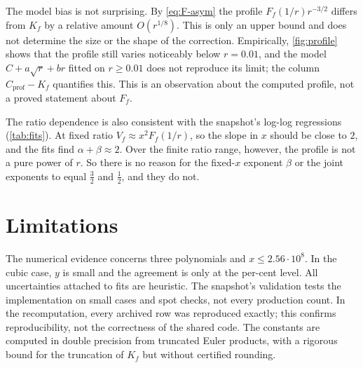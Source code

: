The model bias is not surprising. By \eqref{eq:F-asym} the profile $F_f(1/r)r^{-3/2}$ differs from $K_f$ by a relative amount $O(r^{1/8})$. This is only an upper bound and does not determine the size or the shape of the correction. Empirically, \cref{fig:profile} shows that the profile still varies noticeably below $r=0.01$, and the model $C+a\sqrt r+br$ fitted on $r\ge0.01$ does not reproduce its limit; the column $C_{\mathrm{prof}}-K_f$ quantifies this. This is an observation about the computed profile, not a proved statement about $F_f$.

The ratio dependence is also consistent with the snapshot's log-log regressions (\cref{tab:fits}). At fixed ratio $V_f\approx x^2F_f(1/r)$, so the slope in $x$ should be close to $2$, and the fits find $\alpha+\beta\approx2$. Over the finite ratio range, however, the profile is not a pure power of $r$. So there is no reason for the fixed-$x$ exponent $\beta$ or the joint exponents to equal $\frac32$ and $\frac12$, and they do not.

\begin{table}[ht]
\centering

\caption{Snapshot regressions of $\log V$ on $\log f(y)$ (fixed $x=\xmaxdata$), on $\log x$ (fixed ratio: the mean of the eight ratio-specific slopes), and jointly on both. In parentheses: formal OLS standard errors for the fixed-$x$ and joint fits; for the fixed-ratio column, the standard error of the mean of the eight slopes, that is, their sample standard deviation divided by $\sqrt8$, which is not a regression standard error. None of these is a rigorous uncertainty.}\label{tab:fits}
\end{table}

\section{Limitations}

The numerical evidence concerns three polynomials and $x\le2.56\cdot10^8$. In the cubic case, $y$ is small and the agreement is only at the per-cent level. All uncertainties attached to fits are heuristic. The snapshot's validation tests the implementation on small cases and spot checks, not every production count. In the recomputation, every archived row was reproduced exactly; this confirms reproducibility, not the correctness of the shared code. The constants are computed in double precision from truncated Euler products, with a rigorous bound for the truncation of $K_f$ but without certified rounding.
